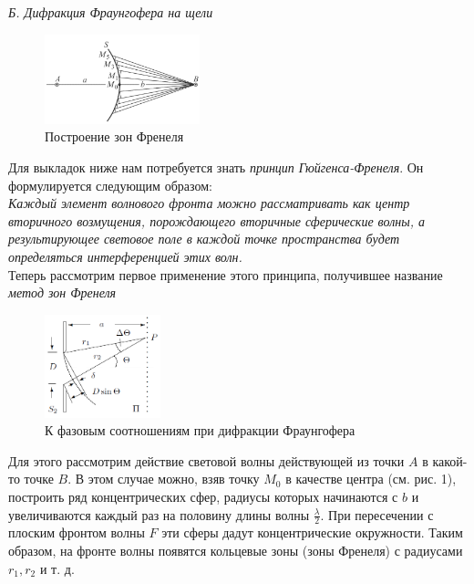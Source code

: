 \documentclass[a4paper, 12pt]{article}%
\begin{document}
	 \textit{Б. Дифракция Фраунгофера на щели}\\
	 
	 \begin{figure}
	 	\begin{center}
	 		\includegraphics[width = 0.4\textwidth]{2.png}
	 	\end{center}
	 	\caption{Построение зон Френеля}
	 \end{figure}
	 Для выкладок ниже нам потребуется знать \textit{принцип Гюйгенса-Френеля}. Он формулируется следующим образом:\\
	 \textit{Каждый элемент волнового фронта можно рассматривать как центр  вторичного возмущения, порождающего вторичные сферические волны, а результирующее световое поле  в каждой точке пространства будет определяться интерференцией этих волн.}\\
	 Теперь рассмотрим первое применение этого принципа, получившее название \textit{метод зон Френеля}
	 
	 \begin{figure}
	 	\begin{center}
	 		\includegraphics[width = 0.3\textwidth]{1.png}
	 	\end{center}
	 	\caption{К фазовым соотношениям при дифракции Фраунгофера}
	 	\vspace{+30pt}
	 \end{figure}
	 
	 Для этого рассмотрим действие световой волны действующей из точки $A$ в какой-то точке $B$.
	 В этом случае можно, взяв точку $M_0$ в качестве центра (см. рис. 1), построить ряд концентрических сфер, радиусы которых начинаются с $b$ и увеличиваются каждый раз на половину длины волны $\frac{\lambda}{2}$. При пересечении с плоским фронтом волны $F$ эти сферы дадут концентрические окружности. Таким образом, на фронте волны появятся кольцевые зоны (зоны Френеля) с радиусами $r_1, r_2$ и т. д.
	 
\end{document}
